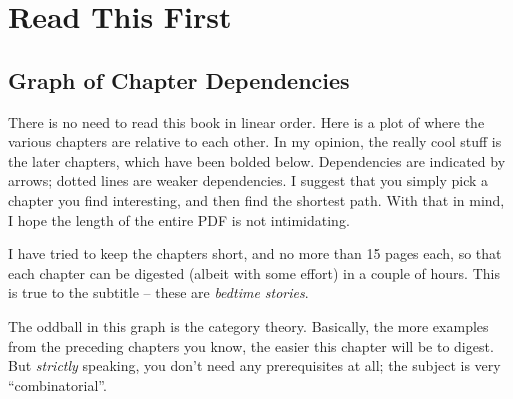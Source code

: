 \addtocounter{chapter}{-1}
\chapter{Read This First}
\section{Graph of Chapter Dependencies}

There is no need to read this book in linear order.
Here is a plot of where the various chapters are relative to each other.
In my opinion, the really cool stuff is the later chapters,
which have been bolded below.
Dependencies are indicated by arrows;
dotted lines are weaker dependencies.
I suggest that you simply pick a chapter you find interesting,
and then find the shortest path.
With that in mind, I hope the length of the entire PDF is not intimidating.


I have tried to keep the chapters short, and no more than 15 pages each,
so that each chapter can be digested (albeit with some effort) in a couple of hours.
This is true to the subtitle -- these are \emph{bedtime stories}.

The oddball in this graph is the category theory.
Basically, the more examples from the preceding chapters you know,
the easier this chapter will be to digest.
But \emph{strictly} speaking, you don't need any prerequisites at all;
the subject is very ``combinatorial''.


\eject

